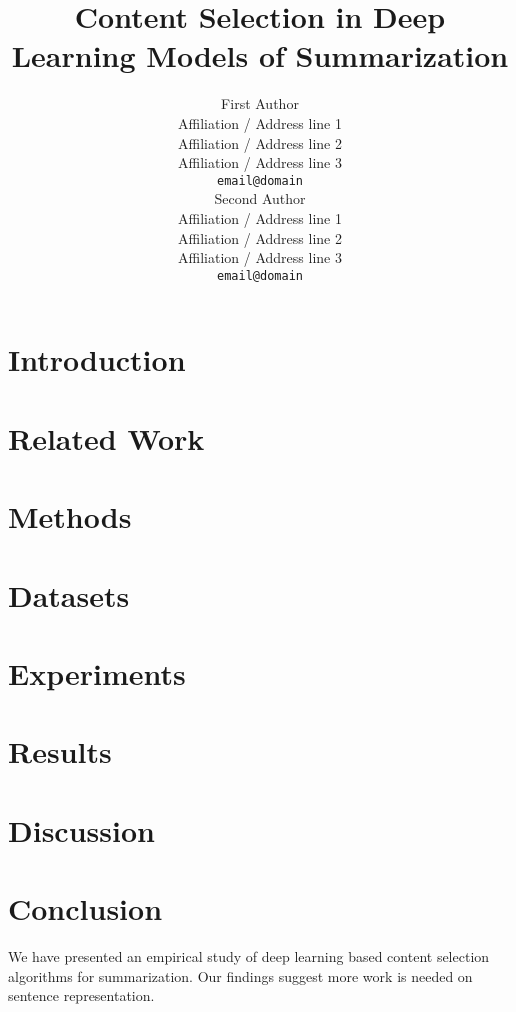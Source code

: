 \documentclass[11pt,a4paper]{article}
\title{Content Selection in Deep Learning Models of Summarization}
\author{First Author \\
  Affiliation / Address line 1 \\
  Affiliation / Address line 2 \\
  Affiliation / Address line 3 \\
  {\tt email@domain} \\\And
  Second Author \\
  Affiliation / Address line 1 \\
  Affiliation / Address line 2 \\
  Affiliation / Address line 3 \\
  {\tt email@domain} \\}
\date{}
\begin{document}
\maketitle
\begin{abstract}
\end{abstract}



\section{Introduction}


\section{Related Work}


\section{Methods}


%



\section{Datasets}
\label{sec:datasets}






\section{Experiments}


\section{Results}


\section{Discussion}



\section{Conclusion}
We have presented an empirical study of deep learning based content selection
algorithms for summarization. Our findings suggest more work is needed 
on sentence representation.






\newpage
\onecolumn
\appendix



\makeappendix
\end{document}
